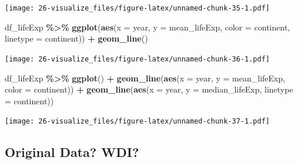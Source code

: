 \documentclass[
  xelatex, ja=standard]{bxjsbook}
\newenvironment{Shaded}{\begin{snugshade}}{\end{snugshade}}
\newcommand{\AttributeTok}[1]{\textcolor[rgb]{0.13,0.29,0.53}{#1}}
\newcommand{\FunctionTok}[1]{\textcolor[rgb]{0.13,0.29,0.53}{\textbf{#1}}}
\newcommand{\NormalTok}[1]{#1}
\newcommand{\SpecialCharTok}[1]{\textcolor[rgb]{0.81,0.36,0.00}{\textbf{#1}}}
\theoremstyle{definition}
\theoremstyle{definition}
\theoremstyle{definition}
\theoremstyle{definition}
\theoremstyle{remark}
\begin{document}
\texttt{[image: 26-visualize\_files/figure-latex/unnamed-chunk-35-1.pdf]}

\begin{Shaded}
\begin{Highlighting}[]
\NormalTok{df\_lifeExp }\SpecialCharTok{\%\textgreater{}\%} \FunctionTok{ggplot}\NormalTok{(}\FunctionTok{aes}\NormalTok{(}\AttributeTok{x =}\NormalTok{ year, }\AttributeTok{y =}\NormalTok{ mean\_lifeExp, }\AttributeTok{color =}\NormalTok{ continent, }\AttributeTok{linetype =}\NormalTok{ continent)) }\SpecialCharTok{+}
  \FunctionTok{geom\_line}\NormalTok{()}
\end{Highlighting}
\end{Shaded}

\texttt{[image: 26-visualize\_files/figure-latex/unnamed-chunk-36-1.pdf]}

\begin{Shaded}
\begin{Highlighting}[]
\NormalTok{df\_lifeExp }\SpecialCharTok{\%\textgreater{}\%} \FunctionTok{ggplot}\NormalTok{() }\SpecialCharTok{+}
  \FunctionTok{geom\_line}\NormalTok{(}\FunctionTok{aes}\NormalTok{(}\AttributeTok{x =}\NormalTok{ year, }\AttributeTok{y =}\NormalTok{ mean\_lifeExp, }\AttributeTok{color =}\NormalTok{ continent)) }\SpecialCharTok{+} 
  \FunctionTok{geom\_line}\NormalTok{(}\FunctionTok{aes}\NormalTok{(}\AttributeTok{x =}\NormalTok{ year, }\AttributeTok{y =}\NormalTok{ median\_lifeExp, }\AttributeTok{linetype =}\NormalTok{ continent))}
\end{Highlighting}
\end{Shaded}

\texttt{[image: 26-visualize\_files/figure-latex/unnamed-chunk-37-1.pdf]}

\hypertarget{original-data-wdi}{%
\subsection{Original Data? WDI?}\label{original-data-wdi}}
\end{document}
